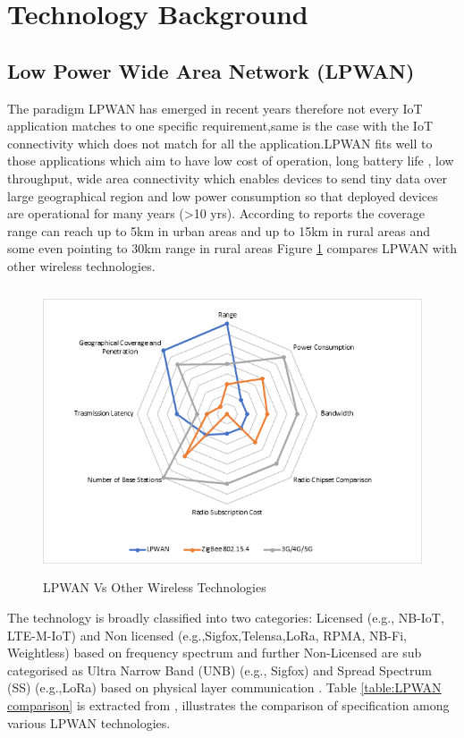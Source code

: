 \documentclass[12pt]{article}
\newcommand{\TODO}{\todo[inline]}
\begin{document}
\newpage
\section{Technology Background}\label{technology background}
\TODO{re-write this para}

\subsection{Low Power Wide Area Network (LPWAN)}
The paradigm LPWAN has emerged in recent years therefore not every IoT application matches to one specific requirement,same is the case with the IoT connectivity which does not match for all the application.LPWAN fits well to those applications which aim to have low cost of operation, long battery life , low throughput, wide area connectivity which enables devices to send tiny data over large geographical region and low power consumption so that deployed devices are operational for many years (>10 yrs). According to reports the coverage range can reach up to 5km in urban areas and up to 15km in rural areas \cite{centenaro2016long} and some even pointing to 30km range in rural areas \cite{petajajarvi2016evaluation} Figure \ref{fig:LPWAN Vs Other Wireless Technologies} compares LPWAN with other wireless technologies.

\begin{figure}[H]
  \includegraphics[trim={3cm 0 4cm 0},width=\columnwidth,height=8.5cm,keepaspectratio]{Images/lpwan_radar_2.png}
  \centering
  \caption{LPWAN Vs Other Wireless Technologies \cite{lpwanradar}}
  \label{fig:LPWAN Vs Other Wireless Technologies}
\end{figure}

The technology is broadly classified into two categories: Licensed (e.g., NB-IoT, LTE-M-IoT) and Non licensed (e.g.,Sigfox,Telensa,LoRa, RPMA, NB-Fi, Weightless) based on frequency spectrum \cite{8612009} and further Non-Licensed are sub categorised as Ultra Narrow Band (UNB) (e.g., Sigfox) and Spread Spectrum (SS) (e.g.,LoRa) based on physical layer communication \cite{8544414}. Table \ref{table:LPWAN comparison} is extracted from \cite{LPWANspecs}, illustrates the comparison of specification among various LPWAN technologies. \par
\end{document}
